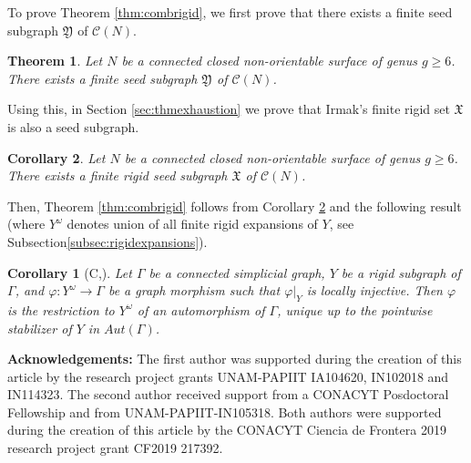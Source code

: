 \documentclass{artv3}
\newtheorem*{corollaryno}{Corollary}
\newtheorem{Theo}{Theorem}
\newtheorem{Coro}[Theo]{Corollary}
\newcommand*{\cg}[1]{\mathcal{C}(#1)}
\newcommand*{\Y}{\mathfrak{Y}}
\newcommand*{\X}{\mathfrak{X}}
\begin{document}
To prove Theorem \ref{thm:combrigid}, we first prove that there exists a finite seed subgraph $\Y$ of $\cg{N}$.

\begin{Theo}\label{thm:exhaustionY}
 Let $N$ be a connected closed non-orientable surface of genus $g \geq 6$. There exists a finite seed subgraph $\Y$ of $\cg{N}$.
\end{Theo}

Using this, in Section \ref{sec:thmexhaustion} we prove that Irmak's finite rigid set $\X$ is also a seed subgraph.

\begin{Coro}\label{cor:exhaustionX}
 Let $N$ be a connected closed non-orientable surface of genus $g \geq 6$. There exists a finite rigid seed subgraph $\X$ of $\cg{N}$.
\end{Coro}

Then, Theorem \ref{thm:combrigid} follows from Corollary \ref{cor:exhaustionX} and the following result (where $Y^{\omega}$ denotes union of all finite rigid expansions of $Y$, see Subsection\ref{subsec:rigidexpansions}).

\begin{corollaryno}[C,\cite{JHH2}]
    Let $\Gamma$ be a connected simplicial graph, $Y$ be a rigid subgraph of $\Gamma$, and $\varphi: Y^{\omega} \to \Gamma$ be a graph morphism such that $\varphi|_{Y}$ is locally injective. Then $\varphi$ is the restriction to $Y^{\omega}$ of an automorphism of $\Gamma$, unique up to the pointwise stabilizer of $Y$ in $Aut(\Gamma)$.
\end{corollaryno}


\textbf{Acknowledgements:} 
 The first author was supported during the creation of this article by the research project grants UNAM-PAPIIT IA104620, IN102018 and IN114323. 
 The second author received support from a CONACYT Posdoctoral Fellowship and from UNAM-PAPIIT-IN105318.
 Both authors were supported during the creation of this article by the CONACYT Ciencia de Frontera 2019 research project grant CF2019 217392.
\end{document}
